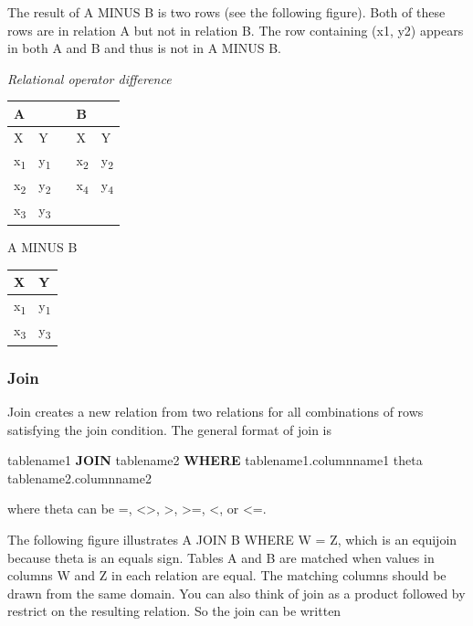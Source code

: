 \documentclass[
]{article}
\newenvironment{Shaded}{\begin{snugshade}}{\end{snugshade}}
\newcommand{\KeywordTok}[1]{\textcolor[rgb]{0.13,0.29,0.53}{\textbf{#1}}}
\newcommand{\NormalTok}[1]{#1}
\begin{document}
The result of A MINUS B is two rows (see the following figure). Both of
these rows are in relation A but not in relation B. The row containing
(x1, y2) appears in both A and B and thus is not in A MINUS B.

\emph{Relational operator difference}

\begin{longtable}[]{@{}lllll@{}}
\toprule
A & & & B & \\
\midrule
\endhead
X & Y & & X & Y \\
x\textsubscript{1} & y\textsubscript{1} & & x\textsubscript{2} & y\textsubscript{2} \\
x\textsubscript{2} & y\textsubscript{2} & & x\textsubscript{4} & y\textsubscript{4} \\
x\textsubscript{3} & y\textsubscript{3} & & & \\
\bottomrule
\end{longtable}

A MINUS B

\begin{longtable}[]{@{}ll@{}}
\toprule
X & Y \\
\midrule
\endhead
x\textsubscript{1} & y\textsubscript{1} \\
x\textsubscript{3} & y\textsubscript{3} \\
\bottomrule
\end{longtable}

\hypertarget{join-1}{%
\subsubsection*{Join}\label{join-1}}

Join creates a new relation from two relations for all combinations of
rows satisfying the join condition. The general format of join is

\begin{Shaded}
\begin{Highlighting}[]
\NormalTok{tablename1 }\KeywordTok{JOIN}\NormalTok{ tablename2 }\KeywordTok{WHERE}\NormalTok{ tablename1.columnname1 theta}
\NormalTok{    tablename2.columnname2}
\end{Highlighting}
\end{Shaded}

where theta can be =, \textless\textgreater, \textgreater, \textgreater=, \textless, or \textless=.

The following figure illustrates A JOIN B WHERE W = Z, which is an
equijoin because theta is an equals sign. Tables A and B are matched
when values in columns W and Z in each relation are equal. The matching
columns should be drawn from the same domain. You can also think of join
as a product followed by restrict on the resulting relation. So the join
can be written
\end{document}

